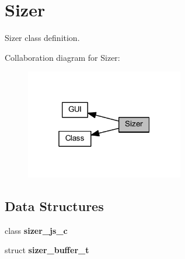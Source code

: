 \section{Sizer}
\label{group___sizer}


Sizer class definition.  


Collaboration diagram for Sizer\+:\nopagebreak
\begin{figure}[H]
\begin{center}
\leavevmode
\includegraphics[width=196pt]{group___sizer}
\end{center}
\end{figure}
\subsection*{Data Structures}
\begin{DoxyCompactItemize}
\item 
class \textbf{ sizer\+\_\+js\+\_\+c}
\item 
struct \textbf{ sizer\+\_\+buffer\+\_\+t}
\end{DoxyCompactItemize}
